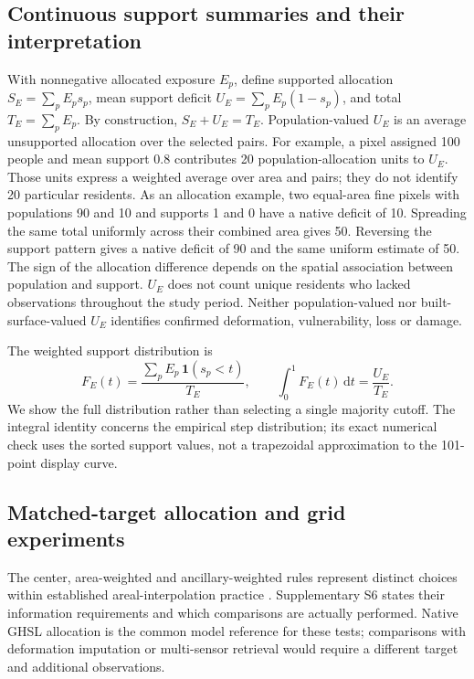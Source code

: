 \documentclass[pdflatex,lineno,sn-nature]{sn-jnl}
\begin{document}
\subsection{Continuous support summaries and their interpretation}
With nonnegative allocated exposure $E_p$, define supported allocation $S_E=\sum_p E_p s_p$, mean support deficit $U_E=\sum_p E_p(1-s_p)$, and total $T_E=\sum_p E_p$. By construction, $S_E+U_E=T_E$. Population-valued $U_E$ is an average unsupported allocation over the selected pairs. For example, a pixel assigned 100 people and mean support 0.8 contributes 20 population-allocation units to $U_E$. Those units express a weighted average over area and pairs; they do not identify 20 particular residents. As an allocation example, two equal-area fine pixels with populations 90 and 10 and supports 1 and 0 have a native deficit of 10. Spreading the same total uniformly across their combined area gives 50. Reversing the support pattern gives a native deficit of 90 and the same uniform estimate of 50. The sign of the allocation difference depends on the spatial association between population and support. $U_E$ does not count unique residents who lacked observations throughout the study period. Neither population-valued nor built-surface-valued $U_E$ identifies confirmed deformation, vulnerability, loss or damage.

The weighted support distribution is
\begin{equation}
F_E(t)=\frac{\sum_p E_p\,\mathbf{1}(s_p<t)}{T_E},\qquad
\int_0^1 F_E(t)\,\mathrm{d}t=\frac{U_E}{T_E}.
\end{equation}
We show the full distribution rather than selecting a single majority cutoff. The integral identity concerns the empirical step distribution; its exact numerical check uses the sorted support values, not a trapezoidal approximation to the 101-point display curve.

\subsection{Matched-target allocation and grid experiments}
The center, area-weighted and ancillary-weighted rules represent distinct choices within established areal-interpolation practice \citep{eicher2001dasymetric,mennis2003population}. Supplementary S6 states their information requirements and which comparisons are actually performed. Native GHSL allocation is the common model reference for these tests; comparisons with deformation imputation or multi-sensor retrieval would require a different target and additional observations.
\end{document}
